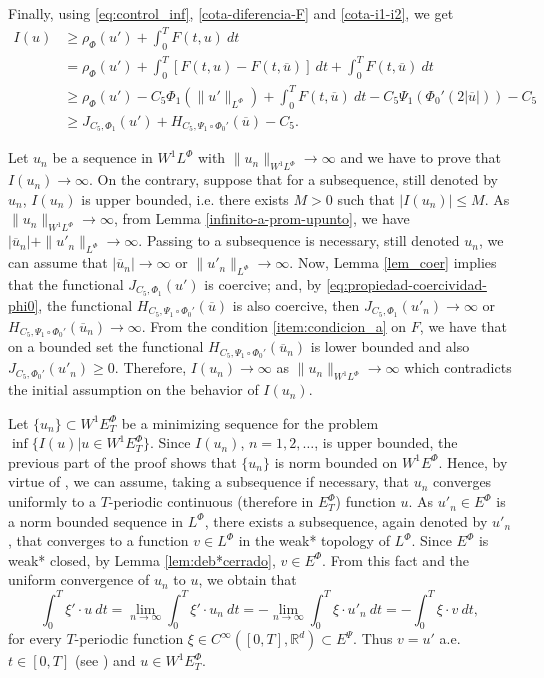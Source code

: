 \documentclass[twoside]{elsarticle}
\theoremstyle{remark}
\newcommand{\orlnor}{\|_{L^{\Phi}}}
\newcommand{\lphi}{L^{\Phi}}
\newcommand{\ephi}{E^{\Phi}}
\newcommand{\wphi}{W^{1}\lphi}
\newcommand{\wphiet}{W^{1}\ephi_T}
\newcommand{\wphie}{W^{1}\ephi}
\newcommand{\sobnor}{\|_{W^{1}\lphi}}
\newcommand{\rr}{\mathbb{R}}
\renewcommand{\leq}{\leqslant}
\renewcommand{\geq}{\geqslant}
\newcommand{\epsi}{E^{\Psi}}
\begin{document}
Finally, using  \eqref{eq:control_inf},  \eqref{cota-diferencia-F} and
\eqref{cota-i1-i2}, we get
\begin{equation}\label{cota_inf_I}
\begin{split}
I(u)&
\geq\rho_{\Phi}(u')+\int_0^TF(t,u)\ dt
\\ 
&=\rho_{\Phi}( u')+ \int_0^T \left[F(t,u)-F(t,\overline{u})\right]\ dt
+  \int_0^TF(t,\overline{u})\ dt
\\
&\geq \rho_{\Phi}( u')
-C_5 \Phi_1(\|u'\orlnor)
+\int_0^TF(t,\overline{u})\ dt-
C_5 \Psi_1(\Phi_0'(2|\overline{u}|))-
C_5
\\
&\geq 
J_{C_5,\Phi_1}(u')
+H_{C_5, \Psi_1\circ\Phi_0'}(\overline{u})
-C_5.
\end{split}
\end{equation}



Let $u_n$ be  a sequence in $\wphi$ with
$\|u_n\sobnor\to\infty$ and we have to prove that $I(u_n)\to\infty$.
On the contrary, suppose  that for a subsequence,
still denoted by $u_n$, $I(u_n)$ is upper bounded, i.e. there exists $M>0$ such that $|I(u_{n})|\leq M$.
As $\|u_n\sobnor\to\infty$, from Lemma \ref{infinito-a-prom-upunto},  we have $|\overline{u}_n|+\|u'_n\orlnor\to \infty$. Passing to a subsequence is necessary, still denoted $u_n$, we can assume that $|\overline{u}_n|\to \infty$ or $\|u'_n\orlnor\to \infty$.
Now, Lemma \ref{lem_coer} implies that the functional $J_{C_5,\Phi_1}(u')$ is coercive;
and, by \eqref{eq:propiedad-coercividad-phi0},
the functional $H_{C_5,\Psi_1\circ\Phi_0'}(\overline{u})$ is also coercive, then
$J_{C_5,\Phi_1}(u'_n) \to \infty$ or $H_{C_5,\Psi_1\circ\Phi_0'}(\overline{u}_n)\to \infty$.
From the condition \ref{item:condicion_a}  on $F$, we have that on a bounded set the functional $H_{C_5,\Psi_1\circ\Phi_0'}(\overline{u}_n)$ is lower bounded and
also $J_{C_5,\Phi_0'}(u'_n)\geq 0$.
Therefore,  $I(u_n)\to\infty$ as $\|u_n\sobnor\to\infty$ which contradicts the initial assumption on the behavior of $I(u_n)$.

Let $\{u_n\}\subset \wphiet$  be a  minimizing sequence for the problem  $\inf\{I(u)|u\in\wphiet\}$.
Since  $I(u_n)$, $n=1,2,\ldots$,  is upper bounded, the previous part of the proof shows that $\{u_n\}$ is norm bounded on $\wphie$. Hence, by virtue of  \cite[Cor. 2.2]{ABGMS2015}, we can assume, taking a subsequence if necessary, that $u_n$ converges uniformly to a $T$-periodic continuous (therefore in $\ephi_T$)  function $u$. As $u'_n \in \ephi$ is a norm bounded sequence in $\lphi$,
there exists a subsequence, again denoted by $u'_n$, that converges to a function $v\in\lphi$ in the weak* topology of $\lphi$.
Since $\ephi$ is weak* closed, by Lemma \ref{lem:deb*cerrado}, $v\in \ephi$. 
From this fact and the uniform convergence of $u_n$ to $u$, we obtain that
\[
\int_0^T\xi'\cdot u\ dt=\lim_{n\to\infty}\int_0^T\xi'\cdot u_n \ dt=
-\lim_{n\to\infty}\int_0^T\xi\cdot u'_n\ dt=-\int_0^T\xi\cdot v\ dt,
\]
for every $T$-periodic function $\xi\in C^{\infty}([0,T],\rr^d)\subset\epsi$.
Thus $v=u'$ a.e. $t\in [0,T]$ (see \cite[p. 6]{mawhin2010critical}) and $u\in\wphiet$.
\end{document}
